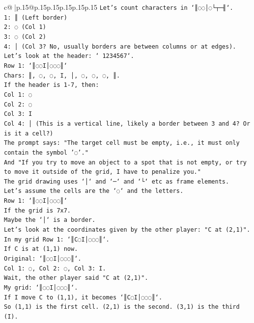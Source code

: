 \documentclass{article}
\begin{document}
{\begin{supertabular}{c@{$\;$}|p{.15\linewidth}@{}p{.15\linewidth}p{.15\linewidth}p{.15\linewidth}p{.15\linewidth}p{.15\linewidth}}
{{{\texttt{Let's count characters in `║◌◌│◌└┬─╢`.} \\
\texttt{1: ║ (Left border)} \\
\texttt{2: ◌ (Col 1)} \\
\texttt{3: ◌ (Col 2)} \\
\texttt{4: │ (Col 3? No, usually borders are between columns or at edges).} \\
\texttt{Let's look at the header: ` 1234567`.} \\
\texttt{Row 1: `║◌◌I│◌◌◌║`} \\
\texttt{Chars: ║, ◌, ◌, I, │, ◌, ◌, ◌, ║.} \\
\texttt{If the header is 1{-}7, then:} \\
\texttt{Col 1: ◌} \\
\texttt{Col 2: ◌} \\
\texttt{Col 3: I} \\
\texttt{Col 4: │ (This is a vertical line, likely a border between 3 and 4? Or is it a cell?)} \\
\texttt{The prompt says: "The target cell must be empty, i.e., it must only contain the symbol '◌'."} \\
\texttt{And "If you try to move an object to a spot that is not empty, or try to move it outside of the grid, I have to penalize you."} \\
\texttt{The grid drawing uses `│` and `─` and `└` etc as frame elements.} \\
\texttt{Let's assume the cells are the `◌` and the letters.} \\
\texttt{Row 1: `║◌◌I│◌◌◌║`} \\
\texttt{If the grid is 7x7.} \\
\texttt{Maybe the `│` is a border.} \\
\texttt{Let's look at the coordinates given by the other player: "C at (2,1)".} \\
\texttt{In my grid Row 1: `║C◌I│◌◌◌║`.} \\
\texttt{If C is at (1,1) now.} \\
\texttt{Original: `║◌◌I│◌◌◌║`.} \\
\texttt{Col 1: ◌, Col 2: ◌, Col 3: I.} \\
\texttt{Wait, the other player said "C at (2,1)".} \\
\texttt{My grid: `║◌◌I│◌◌◌║`.} \\
\texttt{If I move C to (1,1), it becomes `║C◌I│◌◌◌║`.} \\
\texttt{So (1,1) is the first cell. (2,1) is the second. (3,1) is the third (I).} \\
}}}
\end{supertabular}}
\end{document}
